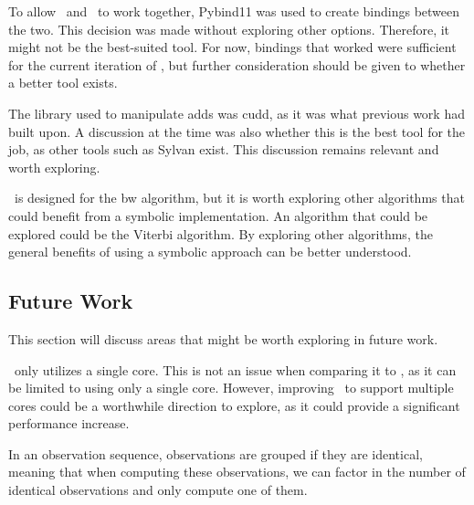 To allow \Cupaal\ and \Jajapy\ to work together, Pybind11 was used to create bindings between the two.
This decision was made without exploring other options. Therefore, it might not be the best-suited tool.
For now, bindings that worked were sufficient for the current iteration of \Cupaal, but further consideration should be given to whether a better tool exists.

The library used to manipulate \glspl{add} was \gls{cudd}, as it was what previous work had built upon.
A discussion at the time was also whether this is the best tool for the job, as other tools such as Sylvan exist.
This discussion remains relevant and worth exploring.

\Cupaal\ is designed for the \gls{bw} algorithm, but it is worth exploring other algorithms that could benefit from a symbolic implementation.
An algorithm that could be explored could be the Viterbi algorithm.
By exploring other algorithms, the general benefits of using a symbolic approach can be better understood.



\subsection{Future Work}\label{subsec:future_work}
This section will discuss areas that might be worth exploring in future work.

\Cupaal\ only utilizes a single core. This is not an issue when comparing it to \Jajapy, as it can be limited to using only a single core.
However, improving \Cupaal\ to support multiple cores could be a worthwhile direction to explore, as it could provide a significant performance increase.

In an observation sequence, observations are grouped if they are identical, meaning that when computing these observations, we can factor in the number of identical observations and only compute one of them.

